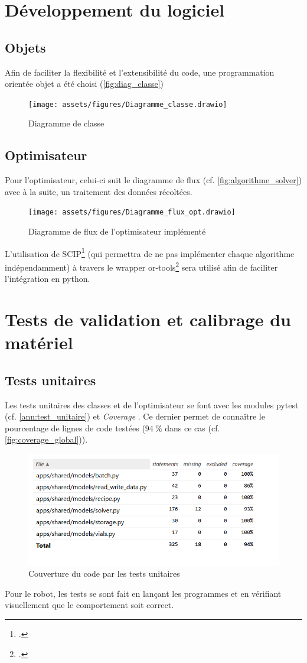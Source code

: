 \section{Développement du logiciel}
\subsection{Objets}
Afin de faciliter la flexibilité et l'extensibilité du code, une programmation orientée objet a été choisi (\cf \autoref{fig:diag_classe})
\begin{figure}[ht]
    \centering
    \texttt{[image: assets/figures/Diagramme\_classe.drawio]}
    \caption{Diagramme de classe}
    \label{fig:diag_classe}
\end{figure}
\subsection{Optimisateur}
Pour l'optimisateur, celui-ci suit le diagramme de flux (cf. \autoref{fig:algorithme_solver}) avec à la suite, un traitement des données récoltées.
\begin{figure}
    \centering
    \texttt{[image: assets/figures/Diagramme\_flux\_opt.drawio]}
    \caption{Diagramme de flux de l'optimisateur implémenté}
    \label{fig:algorithme_solver}
\end{figure}
L'utilisation de SCIP\footcite{SCIP} (qui permettra de ne pas implémenter chaque algorithme indépendamment) à travers le \gls{wrapper} or-tools\footcite{ORTOOLS} sera utilisé afin de faciliter l'intégration en python.

\section{Tests de validation et calibrage du matériel}
\subsection{Tests unitaires}
Les tests unitaires des classes et de l'optimisateur se font avec les modules \og pytest \fg (cf. \autoref{ann:test_unitaire}) et \og \textit{Coverage} \fg. Ce dernier permet de connaître le pourcentage de lignes de code testées ($94~\%$ dans ce cas (cf. \autoref{fig:coverage_global})).
\begin{figure}[H]
    \centering
    \includegraphics[width=1\linewidth]{assets/figures/coverage.png}
    \caption{Couverture du code par les tests unitaires}
    \label{fig:coverage_global}
\end{figure}
Pour le robot, les tests se sont fait en lançant les programmes et en vérifiant visuellement que le comportement soit correct. 